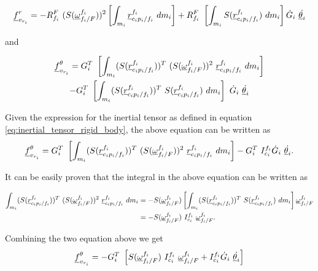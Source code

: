 \begin{equation}
    \vecd{f}^{r}_{v_{r_i}} = -\rot{R}{f_{i}}{F}\ (S(\pvec{\omega}{f_{i}}{F}{f_i}))^{2}
    \left[\int_{m_i} \pvec{r}{c_{i}p_{i}}{f_i}{f_i}\ dm_{i}\right]
    + \rot{R}{f_{i}}{F}\ \left[\int_{m_i} S(\pvec{r}{c_{i}p_{i}}{f_i}{f_i})\ dm_{i}\right] 
    \dot{G}_{i} \ \dot{\vecd{\theta}_{i}}
    \label{eq:coriolis_forces_rigid_body_r_component} 
\end{equation}

and 

\begin{multline*}
    \vecd{f}^{\theta}_{v_{r_i}} = G^{T}_{i}\ \left[\int_{m_i}(S(\pvec{r}{c_{i}p_{i}}{f_i}{f_i}))^{T}\ 
    (S(\pvec{\omega}{f_{i}}{F}{f_i}))^{2}\ \pvec{r}{c_{i}p_{i}}{f_i}{f_i}\ dm_{i} \right] \\
    - G^{T}_{i}\ \left[\int_{m_i}(S(\pvec{r}{c_{i}p_{i}}{f_i}{f_i}))^{T}\ 
    S(\pvec{r}{c_{i}p_{i}}{f_i}{f_i})\ dm_{i}\right]\ \dot{G}_{i} \ \dot{\vecd{\theta}_{i}}
\end{multline*}

Given the expression for the inertial tensor as defined in equation 
\eqref{eq:inertial_tensor_rigid_body}, the above equation can be written as 
\[
    \vecd{f}^{\theta}_{v_{r_i}} = G^{T}_{i}\ \left[\int_{m_i}(S(\pvec{r}{c_{i}p_{i}}{f_i}{f_i}))^{T}\ 
    (S(\pvec{\omega}{f_{i}}{F}{f_i}))^{2}\ \pvec{r}{c_{i}p_{i}}{f_i}{f_i}\ dm_{i} \right] 
    - G^{T}_{i}\ I^{f_i}_{c_i} \dot{G}_{i} \ \dot{\vecd{\theta}_{i}}.
\]

It can be easily proven that the integral in the above equation can be written as 

\begin{align*}
    \int_{m_i}(S(\pvec{r}{c_{i}p_{i}}{f_i}{f_i}))^{T}\ 
    (S(\pvec{\omega}{f_{i}}{F}{f_i}))^{2}\ \pvec{r}{c_{i}p_{i}}{f_i}{f_i}\ dm_{i} 
    & = - S(\pvec{\omega}{f_{i}}{F}{f_i}) \left[\int_{m_i}(S(\pvec{r}{c_{i}p_{i}}{f_i}{f_i}))^{T}\ 
    S(\pvec{r}{c_{i}p_{i}}{f_i}{f_i})\ dm_{i}\right] \pvec{\omega}{f_{i}}{F}{f_i} \\ 
    & = - S(\pvec{\omega}{f_{i}}{F}{f_i})\ I^{f_i}_{c_i}\  \pvec{\omega}{f_{i}}{F}{f_i}.
\end{align*}

Combining the two equation above we get 
\begin{equation}
    \vecd{f}^{\theta}_{v_{r_i}} = - G^{T}_{i}\ \left[ 
    S(\pvec{\omega}{f_{i}}{F}{f_i})\ I^{f_i}_{c_i}\ \pvec{\omega}{f_{i}}{F}{f_i}
    + I^{f_i}_{c_i} \dot{G}_{i} \ \dot{\vecd{\theta}_{i}}  
    \right]
\end{equation}


